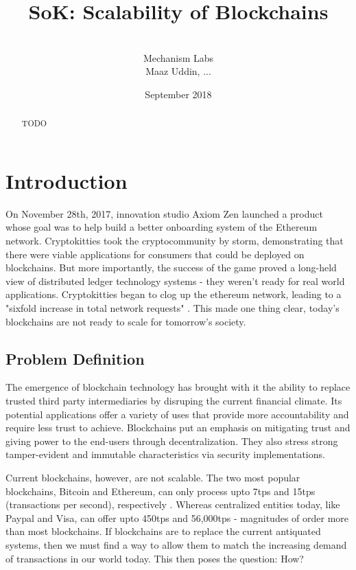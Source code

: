 \documentclass{article}
\title{SoK: Scalability of Blockchains}
\author{
\\ \small{Mechanism Labs} \\ \small{Maaz Uddin, ...}}
\date{September 2018}
\begin{document}
\maketitle

\begin{abstract}
TODO
\end{abstract}

\maketitle

\section{Introduction}
On November 28th, 2017, innovation studio Axiom Zen launched a product whose goal was to help build a better onboarding system of the Ethereum network. Cryptokitties took the cryptocommunity by storm, demonstrating that there were viable applications for consumers that could be deployed on blockchains. But more importantly, the success of the game proved a long-held view of distributed ledger technology systems - they weren't ready for real world applications. Cryptokitties began to clog up the ethereum network, leading to a "sixfold increase in total network requests" \cite{ConsensysCryptokitties}. This made one thing clear, today's blockchains are not ready to scale for tomorrow's society.

\subsection{Problem Definition}
The emergence of blockchain technology has brought with it the ability to replace trusted third party intermediaries by disruping the current financial climate. Its potential applications offer a variety of uses that provide more accountability and require less trust to achieve. Blockchains put an emphasis on mitigating trust and giving power to the end-users through decentralization. They also stress strong tamper-evident and immutable characteristics via security implementations.

Current blockchains, however, are not scalable. The two most popular blockchains, Bitcoin and Ethereum, can only process upto 7tps and 15tps (transactions per second), respectively \cite{NeedCitation, ForBoth}. Whereas centralized entities today, like Paypal and Visa, can offer upto 450tps \cite{PaypalTPS} and 56,000tps \cite{VisaTPS} - magnitudes of order more than most blockchains. If blockchains are to replace the current antiquated systems, then we must find a way to allow them to match the increasing demand of transactions in our world today. This then poses the question: How?
\end{document}
